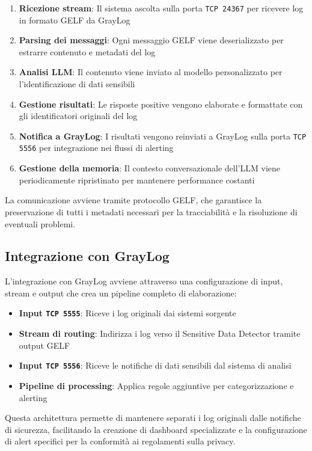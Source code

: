 \documentclass[12pt]{report}
\begin{document}
\begin{enumerate}
    \item \textbf{Ricezione stream}: Il sistema ascolta sulla porta \texttt{TCP 24367} per ricevere log in formato GELF da GrayLog
    \item \textbf{Parsing dei messaggi}: Ogni messaggio GELF viene deserializzato per estrarre contenuto e metadati del log
    \item \textbf{Analisi LLM}: Il contenuto viene inviato al modello personalizzato per l'identificazione di dati sensibili
    \item \textbf{Gestione risultati}: Le risposte positive vengono elaborate e formattate con gli identificatori originali del log
    \item \textbf{Notifica a GrayLog}: I risultati vengono reinviati a GrayLog sulla porta \texttt{TCP 5556} per integrazione nei flussi di alerting
    \item \textbf{Gestione della memoria}: Il contesto conversazionale dell'LLM viene periodicamente ripristinato per mantenere performance costanti
\end{enumerate}

La comunicazione avviene tramite protocollo GELF, che garantisce la preservazione di tutti i metadati necessari per la tracciabilità e la risoluzione di eventuali problemi.

\subsection{Integrazione con GrayLog}
\label{subsec:ver3_integrazione}

L'integrazione con GrayLog avviene attraverso una configurazione di input, stream e output che crea un pipeline completo di elaborazione:

\begin{itemize}
    \item \textbf{Input \texttt{TCP 5555}}: Riceve i log originali dai sistemi sorgente
    \item \textbf{Stream di routing}: Indirizza i log verso il Sensitive Data Detector tramite output GELF
    \item \textbf{Input \texttt{TCP 5556}}: Riceve le notifiche di dati sensibili dal sistema di analisi
    \item \textbf{Pipeline di processing}: Applica regole aggiuntive per categorizzazione e alerting
\end{itemize}

Questa architettura permette di mantenere separati i log originali dalle notifiche di sicurezza, facilitando la creazione di dashboard specializzate e la configurazione di alert specifici per la conformità ai regolamenti sulla privacy.
\end{document}
